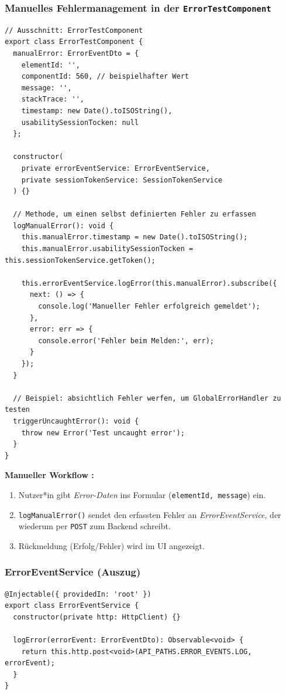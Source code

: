 \documentclass[12pt,oneside]{article}
\begin{document}
\subsubsection{Manuelles Fehlermanagement in der \texttt{ErrorTestComponent}}
\begin{lstlisting}
// Ausschnitt: ErrorTestComponent
export class ErrorTestComponent {
  manualError: ErrorEventDto = {
    elementId: '',
    componentId: 560, // beispielhafter Wert
    message: '',
    stackTrace: '',
    timestamp: new Date().toISOString(),
    usabilitySessionTocken: null
  };

  constructor(
    private errorEventService: ErrorEventService,
    private sessionTokenService: SessionTokenService
  ) {}

  // Methode, um einen selbst definierten Fehler zu erfassen
  logManualError(): void {
    this.manualError.timestamp = new Date().toISOString();
    this.manualError.usabilitySessionTocken = this.sessionTokenService.getToken();

    this.errorEventService.logError(this.manualError).subscribe({
      next: () => {
        console.log('Manueller Fehler erfolgreich gemeldet');
      },
      error: err => {
        console.error('Fehler beim Melden:', err);
      }
    });
  }

  // Beispiel: absichtlich Fehler werfen, um GlobalErrorHandler zu testen
  triggerUncaughtError(): void {
    throw new Error('Test uncaught error');
  }
}
\end{lstlisting}

\noindent
\textbf{Manueller Workflow :}
\begin{enumerate}
  \item Nutzer*in gibt \emph{Error-Daten} ins Formular (\lstinline|elementId, message|) ein.
  \item \lstinline|logManualError()| sendet den erfassten Fehler an \emph{ErrorEventService}, der wiederum per \lstinline|POST| zum Backend schreibt.
  \item Rückmeldung (Erfolg/Fehler) wird im UI angezeigt.
\end{enumerate}

\subsubsection{ErrorEventService (Auszug)}
\begin{lstlisting}
@Injectable({ providedIn: 'root' })
export class ErrorEventService {
  constructor(private http: HttpClient) {}

  logError(errorEvent: ErrorEventDto): Observable<void> {
    return this.http.post<void>(API_PATHS.ERROR_EVENTS.LOG, errorEvent);
  }
}
\end{lstlisting}
\end{document}
